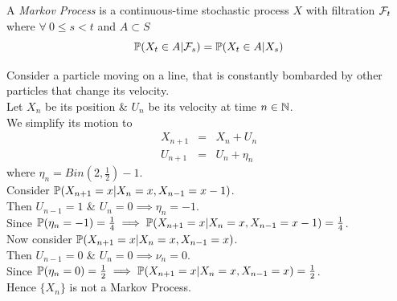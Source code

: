 \documentclass[11pt,a4paper]{article}
\begin{document}
A \textit{Markov Process} is a continuous-time stochastic process $X$ with filtration $\mathcal{F}_t$ where $\forall\ 0\leq s<t$ and $A\subset S$
$$\mathbb{P}(X_t\in A|\mathcal{F}_s)=\mathbb{P}(X_t\in A|X_s)$$

Consider a particle moving on a line, that is constantly bombarded by other particles that change its velocity.\\
Let $X_n$ be its position \& $U_n$ be its velocity at time $n\in\mathbb{N}$.\\
We simplify its motion to
\[\begin{array}{rcl}
X_{n+1}&=&X_n+U_n\\
U_{n+1}&=&U_n+\eta_n
\end{array}\]
where $\eta_n=Bin(2,\frac{1}{2})-1$.\\
Consider $\mathbb{P}(X_{n+1}=x|X_n=x,X_{n-1}=x-1)$.\\
Then $U_{n-1}=1$ \& $U_n=0 \implies \eta_n=-1$.\\
Since $\mathbb{P}(\eta_n=-1)=\frac{1}{4}\implies\mathbb{P}(X_{n+1}=x|X_n=x,X_{n-1}=x-1)=\frac{1}{4}$.\\
Now consider $\mathbb{P}(X_{n+1}=x|X_n=x,X_{n-1}=x)$.\\
Then $U_{n-1}=0$ \& $U_n=0\implies\nu_n=0$.\\
Since $\mathbb{P}(\eta_n=0)=\frac{1}{2}\implies\mathbb{P}(X_{n+1}=x|X_n=x,X_{n-1}=x)=\frac{1}{2}$.\\
Hence $\{X_n\}$ is not a Markov Process.\\
\end{document}
